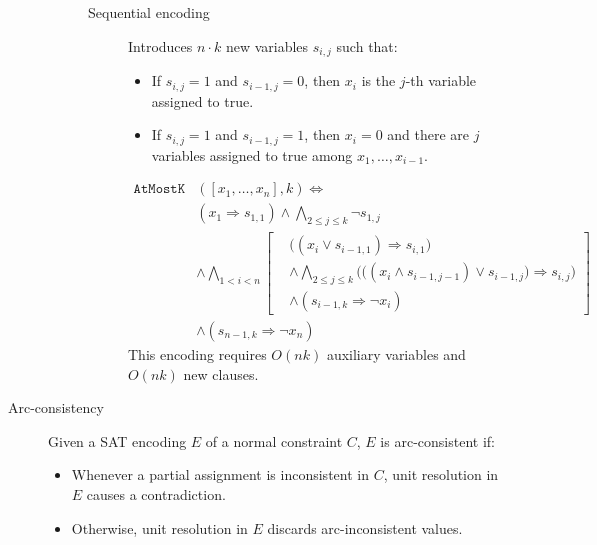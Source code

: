 \begin{description}
\begin{description}
\begin{description}
                    \item[Sequential encoding] 
                        Introduces $n \cdot k$ new variables $s_{i,j}$ such that:
                        \begin{itemize}
                            \item If $s_{i,j} = 1$ and $s_{i-1,j} = 0$, then $x_i$ is the $j$-th variable assigned to true.
                            \item If $s_{i,j} = 1$ and $s_{i-1,j} = 1$, then $x_i = 0$ and there are $j$ variables assigned to true among $x_1, \dots, x_{i-1}$.
                        \end{itemize}
                        \[ 
                            \begin{split}
                                \texttt{AtMostK}&([x_1, \dots, x_n], k) \iff \\
                                & (x_1 \Rightarrow s_{1,1}) \land \bigwedge_{2 \leq j \leq k} \lnot s_{1,j} \\
                                & \land \bigwedge_{1 < i < n} \left[
                                    \begin{split}
                                        & \big( (x_i \vee s_{i-1,1}) \Rightarrow s_{i,1} \big) \\
                                        & \land \bigwedge_{2 \leq j \leq k} \Big( \big( (x_i \land s_{i-1, j-1}) \vee s_{i-1,j} \big) \Rightarrow s_{i,j} \Big) \\
                                        & \land (s_{i-1,k} \Rightarrow \lnot x_i)
                                    \end{split}
                                \right] \\
                                & \land (s_{n-1, k} \Rightarrow \lnot x_n)
                            \end{split}
                        \]
                        This encoding requires $O(nk)$ auxiliary variables and $O(nk)$ new clauses.

                \end{description}
        \end{description}

    \item[Arc-consistency] 
        Given a SAT encoding $E$ of a normal constraint $C$,
        $E$ is arc-consistent if:
        \begin{itemize}
            \item Whenever a partial assignment is inconsistent in $C$, unit resolution in $E$ causes a contradiction.
            \item Otherwise, unit resolution in $E$ discards arc-inconsistent values.
        \end{itemize}
\end{description}